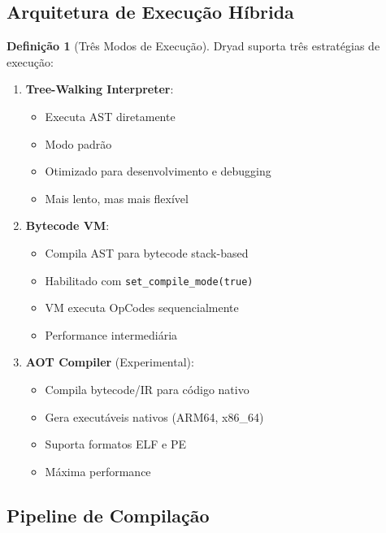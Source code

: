 \documentclass[12pt,a4paper]{article}
\theoremstyle{definition}
\newtheorem{definition}{Definição}[section]
\begin{document}
\subsection{Arquitetura de Execução Híbrida}

\begin{definition}[Três Modos de Execução]
Dryad suporta três estratégias de execução:

\begin{enumerate}
    \item \textbf{Tree-Walking Interpreter}:
    \begin{itemize}
        \item Executa AST diretamente
        \item Modo padrão
        \item Otimizado para desenvolvimento e debugging
        \item Mais lento, mas mais flexível
    \end{itemize}
    
    \item \textbf{Bytecode VM}:
    \begin{itemize}
        \item Compila AST para bytecode stack-based
        \item Habilitado com \texttt{set\_compile\_mode(true)}
        \item VM executa OpCodes sequencialmente
        \item Performance intermediária
    \end{itemize}
    
    \item \textbf{AOT Compiler} (Experimental):
    \begin{itemize}
        \item Compila bytecode/IR para código nativo
        \item Gera executáveis nativos (ARM64, x86\_64)
        \item Suporta formatos ELF e PE
        \item Máxima performance
    \end{itemize}
\end{enumerate}
\end{definition}

\subsection{Pipeline de Compilação}
\end{document}
